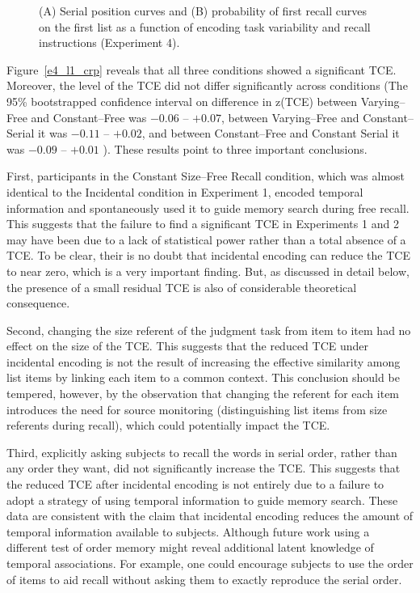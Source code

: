\documentclass[man,natbib,floatsintext]{apa6} %
\begin{document}
\begin{figure}
\caption{(A) Serial position curves and (B) probability of first recall curves on the first list as a function of encoding task variability and recall instructions (Experiment 4).\spcpaneltext}
\label{e4_l1_spc}
\end{figure}

Figure~\ref{e4_l1_crp} reveals that all three conditions showed a significant TCE. Moreover, the level of the TCE did not differ significantly across conditions (The 95\% bootstrapped confidence interval on difference in z(TCE) between Varying--Free and Constant--Free was $-0.06$ -- $+0.07$, between Varying--Free and Constant--Serial it was $-0.11$ -- $+0.02$, and between Constant--Free and Constant Serial it was $-0.09$ -- $+0.01$ ). These results point to three important conclusions.

First, participants in the Constant Size--Free Recall condition, which was almost identical to the Incidental condition in Experiment 1, encoded temporal information and spontaneously used it to guide memory search during free recall. This suggests that the failure to find a significant TCE in Experiments 1 and 2 may have been due to a lack of statistical power rather than a total absence of a TCE. To be clear, their is no doubt that incidental encoding can reduce the TCE to near zero, which is a very important finding. But, as discussed in detail below, the presence of a small residual TCE is also of considerable theoretical consequence.

Second, changing the size referent of the judgment task from item to item had no effect on the size of the TCE. This suggests that the reduced TCE under incidental encoding is not the result of increasing the effective similarity among list items by linking each item to a common context. This conclusion should be tempered, however, by the observation that changing the referent for each item introduces the need for source monitoring (distinguishing list items from size referents during recall), which could potentially impact the TCE.  

Third, explicitly asking subjects to recall the words in serial order, rather than any order they want, did not significantly increase the TCE. This suggests that the reduced TCE after incidental encoding is not entirely due to a failure to adopt a strategy of using temporal information to guide memory search. These data are consistent with the claim that incidental encoding reduces the amount of temporal information available to subjects. Although future work using a different test of order memory might reveal additional latent knowledge of temporal associations. For example, one could encourage subjects to use the order of items to aid recall without asking them to exactly reproduce the serial order. 
\end{document}
